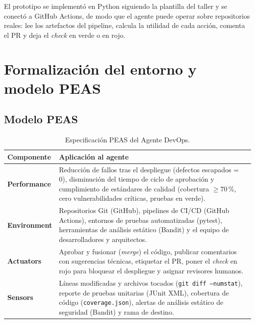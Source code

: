 \documentclass[11pt,a4paper]{article}
\begin{document}
\begin{center}
\end{center}

El prototipo se implementó en Python siguiendo la plantilla del taller y se conectó a GitHub Actions,
de modo que el agente puede operar sobre repositorios reales: lee los artefactos del pipeline, calcula
la utilidad de cada acción, comenta el PR y deja el \textit{check} en verde o en rojo.

\section{Formalización del entorno y modelo PEAS}

\subsection{Modelo PEAS}

\begin{table}[H]
\centering
\caption{Especificación PEAS del Agente DevOps.}
\label{tab:peas}
\begin{tabularx}{\textwidth}{@{}l X@{}}
\toprule
\textbf{Componente} & \textbf{Aplicación al agente} \\
\midrule
\textbf{Performance} & Reducción de fallos tras el despliegue (defectos escapados = 0), disminución del
tiempo de ciclo de aprobación y cumplimiento de estándares de calidad (cobertura $\geq 70\,\%$, cero
vulnerabilidades críticas, pruebas en verde). \\
\addlinespace
\textbf{Environment} & Repositorios Git (GitHub), pipelines de CI/CD (GitHub Actions), entornos de
pruebas automatizadas (pytest), herramientas de análisis estático (Bandit) y el equipo de
desarrolladores y arquitectos. \\
\addlinespace
\textbf{Actuators} & Aprobar y fusionar (\textit{merge}) el código, publicar comentarios con
sugerencias técnicas, etiquetar el PR, poner el \textit{check} en rojo para bloquear el despliegue y
asignar revisores humanos. \\
\addlinespace
\textbf{Sensors} & Líneas modificadas y archivos tocados (\texttt{git diff --numstat}), reporte de
pruebas unitarias (JUnit XML), cobertura de código (\texttt{coverage.json}), alertas de análisis
estático de seguridad (Bandit) y rama de destino. \\
\bottomrule
\end{tabularx}
\end{table}
\end{document}
